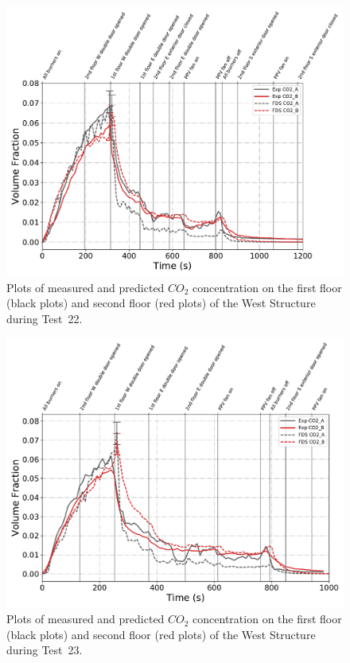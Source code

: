 \begin{figure}[!h]
	\centering
	\includegraphics[width=\columnwidth]{Figures/Plots/Validation/Gas_Concentration/Test_22_CO2}
	\caption[Plots of measured and predicted $CO_2$ concentration during Test~22.]{Plots of measured and predicted $CO_2$ concentration on the first floor (black plots) and second floor (red plots) of the West Structure during Test~22.}
	\label{fig:Test22_CO2}
\end{figure}

\begin{figure}[!h]
	\centering
	\includegraphics[width=\columnwidth]{Figures/Plots/Validation/Gas_Concentration/Test_23_CO2}
	\caption[Plots of measured and predicted $CO_2$ concentration during Test~23.]{Plots of measured and predicted $CO_2$ concentration on the first floor (black plots) and second floor (red plots) of the West Structure during Test~23.}
	\label{fig:Test23_CO2}
\end{figure}

